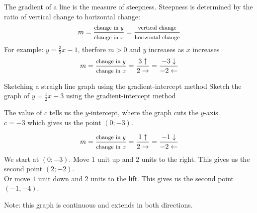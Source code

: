The gradient of a line is the measure of steepness. Steepness is determined by the ratio of vertical change to horizontal change:
\begin{equation*}
m = \dfrac{\mbox{\footnotesize change in $y$}}{\mbox{\footnotesize change in $x$}} = \dfrac{\mbox{\footnotesize vertical change}}{\mbox{\footnotesize horizontal change}}
\end{equation*}
For example: $y=\frac{3}{2}x-1$, therfore $m > 0$ and $y$ increases as $x$ increases
\begin{equation*}
 m = \dfrac{\mbox{\footnotesize change in $y$}}{\mbox{\footnotesize change in $x$}} = \dfrac{3\uparrow}{2\rightarrow} = \dfrac{-3\downarrow}{-2\leftarrow}
\end{equation*}



\begin{wex}{Sketching a straigh line graph using the gradient-intercept method}
{Sketch the graph of $y=\frac{1}{2}x-3$ using the gradient-intercept method}
{
The value of $c$ tells us the $y$-intercept, where the graph cuts the $y$-axis. \\
$c=-3$ which gives us the point $(0;-3)$.


\begin{equation*}
 m = \dfrac{\mbox{\footnotesize change in $y$}}{\mbox{\footnotesize change in $x$}} = \dfrac{1\uparrow}{2\rightarrow} = \dfrac{-1\downarrow}{-2\leftarrow}
\end{equation*}
We start at  $(0;-3)$. Move $1$ unit up and $2$ units to the right. This gives us the second point $(2;-2)$. \\
Or move $1$ unit down and $2$ units to the lift. This gives us the second point $(-1,-4)$.


\begin{center}
\end{center}

Note: this graph is continuous and extends in both directions.       
}
\end{wex}



